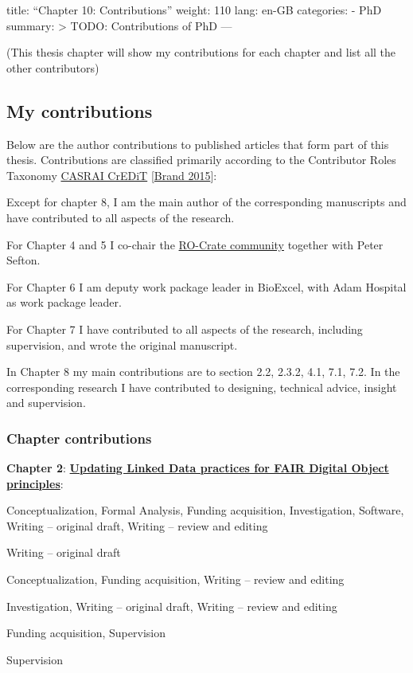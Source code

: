 title: ``Chapter 10: Contributions'' weight: 110 lang: en-GB categories:
- PhD summary: \textgreater{} TODO: Contributions of PhD ---

(This thesis chapter will show my contributions for each chapter and
list all the other contributors)

\hypertarget{my-contributions}{%
\subsection{My contributions}\label{my-contributions}}

Below are the author contributions to published articles that form part
of this thesis. Contributions are classified primarily according to the
Contributor Roles Taxonomy \href{https://casrai.org/credit/}{CASRAI
CrEDiT} {[}\href{https://doi.org/10.1087/20150211}{Brand 2015}{]}:

Except for chapter 8, I am the main author of the corresponding
manuscripts and have contributed to all aspects of the research.

For Chapter 4 and 5 I co-chair the
\href{https://www.researchobject.org/ro-crate/community}{RO-Crate
community} together with Peter Sefton.

For Chapter 6 I am deputy work package leader in BioExcel, with Adam
Hospital as work package leader.

For Chapter 7 I have contributed to all aspects of the research,
including supervision, and wrote the original manuscript.

In Chapter 8 my main contributions are to section 2.2, 2.3.2, 4.1, 7.1,
7.2. In the corresponding research I have contributed to designing,
technical advice, insight and supervision.

\hypertarget{chapter-contributions}{%
\subsubsection{Chapter contributions}\label{chapter-contributions}}

\textbf{Chapter 2}: \href{../updating-ld-for-fdo/}{\textbf{Updating
Linked Data practices for FAIR Digital Object principles}}:

\begin{description}
\tightlist
\item[Stian Soiland-Reyes]
Conceptualization, Formal Analysis, Funding acquisition, Investigation,
Software, Writing -- original draft, Writing -- review and editing
\item[Leyla Jael Castro]
Writing -- original draft
\item[Daniel Garijo]
Conceptualization, Funding acquisition, Writing -- review and editing
\item[Marc Portier]
Investigation, Writing -- original draft, Writing -- review and editing
\item[Carole Goble:]
Funding acquisition, Supervision
\item[Paul Groth]
Supervision
\end{description}

